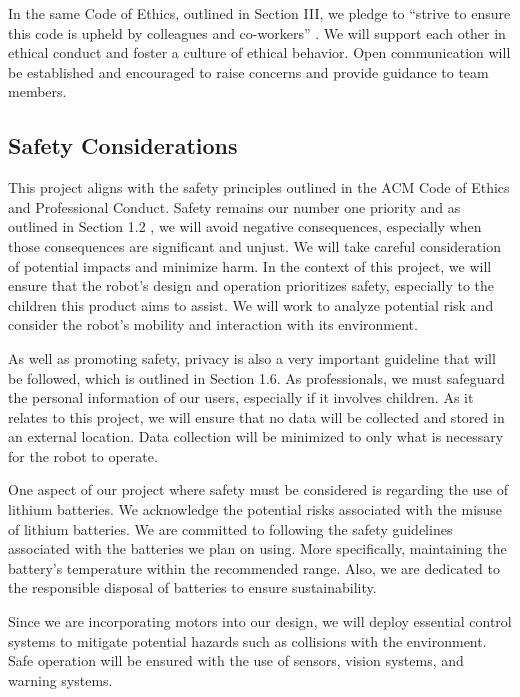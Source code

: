 \documentclass{report}
\begin{document}
    In the same Code of Ethics, outlined in Section III, we pledge to “strive to ensure this code is upheld by colleagues and co-workers” \cite{IEEE_2020}. We will support each other in ethical conduct and foster a culture of ethical behavior. Open communication will be established and encouraged to raise concerns and provide guidance to team members.

    \subsection{Safety Considerations}
    This project aligns with the safety principles outlined in the ACM Code of Ethics and Professional Conduct. Safety remains our number one priority and as outlined in Section 1.2 \cite{ACM_2018}, we will avoid negative consequences, especially when those consequences are significant and unjust. We will take careful consideration of potential impacts and minimize harm. In the context of this project, we will ensure that the robot’s design and operation prioritizes safety, especially to the children this product aims to assist. We will work to analyze potential risk and consider the robot’s mobility and interaction with its environment.

    As well as promoting safety, privacy is also a very important guideline that will be followed, which is outlined in Section 1.6. As professionals, we must safeguard the personal information of our users, especially if it involves children. As it relates to this project, we will ensure that no data will be collected and stored in an external location. Data collection will be minimized to only what is necessary for the robot to operate.

    One aspect of our project where safety must be considered is regarding the use of lithium batteries. We acknowledge the potential risks associated with the misuse of lithium batteries. We are committed to following the safety guidelines associated with the batteries we plan on using. More specifically, maintaining the battery’s temperature within the recommended range. Also, we are dedicated to the responsible disposal of batteries to ensure sustainability.

    Since we are incorporating motors into our design, we will deploy essential control systems to mitigate potential hazards such as collisions with the environment. Safe operation will be ensured with the use of sensors, vision systems, and warning systems.

    
    
\end{document}
